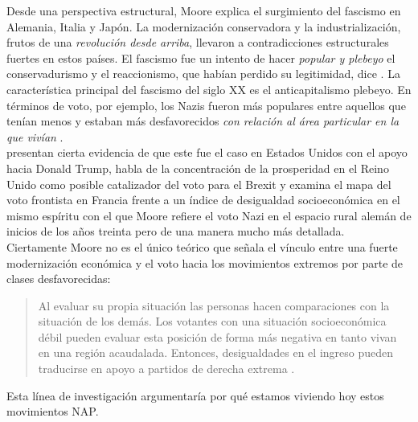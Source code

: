 Desde una perspectiva estructural, Moore explica el surgimiento del fascismo en Alemania, Italia y Japón. La modernización conservadora y la industrialización, frutos de una \textit{revolución desde arriba}, llevaron a contradicciones estructurales fuertes en estos países. El fascismo fue un intento de hacer \textit{popular y plebeyo} el conservadurismo y el reaccionismo, que habían perdido su legitimidad, dice \textcite{Moore66}. La característica principal del fascismo del siglo XX es el anticapitalismo plebeyo. En términos de voto, por ejemplo, los Nazis fueron más populares entre aquellos que tenían menos y estaban más desfavorecidos \textit{con relación al área particular en la que vivían} \parencite{Moore66}.\\ 

\textcite{Sides16} presentan cierta evidencia de que este fue el caso en Estados Unidos con el apoyo hacia Donald Trump, \textcite{Arnade16} habla de la concentración de la prosperidad en el Reino Unido como posible catalizador del voto para el Brexit y \textcite{LeBras15} examina el mapa del voto frontista en Francia frente a un índice de desigualdad socioeconómica en el mismo espíritu con el que Moore refiere el voto Nazi en el espacio rural alemán de inicios de los años treinta pero de una manera mucho más detallada.\\

Ciertamente Moore no es el único teórico que señala el vínculo entre una fuerte modernización económica y el voto hacia los movimientos extremos por parte de clases desfavorecidas: 
\begin{quote}
Al evaluar su propia situación las personas hacen comparaciones con la situación de los demás. Los votantes con una situación socioeconómica débil pueden evaluar esta posición de forma más negativa en tanto vivan en una región acaudalada. Entonces, desigualdades en el ingreso pueden traducirse en apoyo a partidos de derecha extrema \parencite[traducción propia]{Coffe07}.
\end{quote} Esta línea de investigación argumentaría por qué estamos viviendo hoy estos movimientos NAP.\\ 

